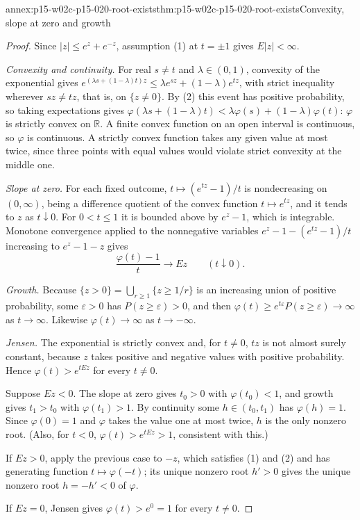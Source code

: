 \begin{annexitem}{annex:p15-w02c-p15-020-root-exists}{thm:p15-w02c-p15-020-root-exists}{Convexity, slope at zero and growth}
\begin{proof}
Since \(|z|\leq e^z+e^{-z}\), assumption (1) at \(t=\pm1\) gives
\(E|z|<\infty\).

\emph{Convexity and continuity.} For real \(s\neq t\) and
\(\lambda\in(0,1)\), convexity of the exponential gives
\(e^{(\lambda s+(1-\lambda)t)z}\leq\lambda e^{sz}+(1-\lambda)e^{tz}\),
with strict inequality wherever \(sz\neq tz\), that is, on
\(\{z\neq0\}\). By (2) this event has positive probability, so taking
expectations gives
\(\varphi(\lambda s+(1-\lambda)t)<\lambda\varphi(s)+(1-\lambda)\varphi(t)\):
\(\varphi\) is strictly convex on \(\mathbb R\). A finite convex function
on an open interval is continuous, so \(\varphi\) is continuous.
A strictly convex function takes any given value at most twice, since
three points with equal values would violate strict convexity at the
middle one.

\emph{Slope at zero.} For each fixed outcome, \(t\mapsto(e^{tz}-1)/t\) is
nondecreasing on \((0,\infty)\), being a difference quotient of the
convex function \(t\mapsto e^{tz}\), and it tends to \(z\) as
\(t\downarrow0\). For \(0<t\leq1\) it is bounded above by
\(e^z-1\), which is integrable. Monotone convergence applied to the
nonnegative variables \(e^z-1-(e^{tz}-1)/t\) increasing to
\(e^z-1-z\) gives
\[
 \frac{\varphi(t)-1}{t}\longrightarrow Ez\qquad(t\downarrow0).
\]

\emph{Growth.} Because \(\{z>0\}=\bigcup_{r\geq1}\{z\geq1/r\}\) is an
increasing union of positive probability, some \(\varepsilon>0\) has
\(P(z\geq\varepsilon)>0\), and then
\(\varphi(t)\geq e^{t\varepsilon}P(z\geq\varepsilon)\to\infty\) as
\(t\to\infty\). Likewise \(\varphi(t)\to\infty\) as \(t\to-\infty\).

\emph{Jensen.} The exponential is strictly convex and, for \(t\neq0\),
\(tz\) is not almost surely constant, because \(z\) takes positive and
negative values with positive probability. Hence
\(\varphi(t)>e^{tEz}\) for every \(t\neq0\).

Suppose \(Ez<0\). The slope at zero gives \(t_0>0\) with
\(\varphi(t_0)<1\), and growth gives \(t_1>t_0\) with \(\varphi(t_1)>1\).
By continuity some \(h\in(t_0,t_1)\) has \(\varphi(h)=1\). Since
\(\varphi(0)=1\) and \(\varphi\) takes the value one at most twice,
\(h\) is the only nonzero root. (Also, for \(t<0\),
\(\varphi(t)>e^{tEz}>1\), consistent with this.)

If \(Ez>0\), apply the previous case to \(-z\), which satisfies (1) and
(2) and has generating function \(t\mapsto\varphi(-t)\); its unique
nonzero root \(h'>0\) gives the unique nonzero root \(h=-h'<0\) of
\(\varphi\).

If \(Ez=0\), Jensen gives \(\varphi(t)>e^0=1\) for every \(t\neq0\).
\end{proof}
\end{annexitem}

